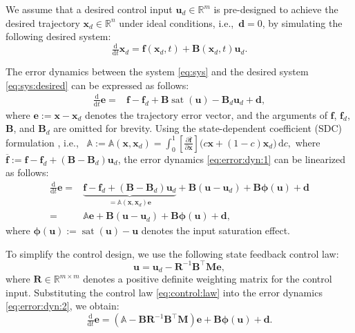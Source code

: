 \documentclass{ifacconf}
\newcommand\ie{\textrm{i.e.,\ }}
\newcommand\R{\mathbb{R}}
\newcommand*{\mv}[1]{\boldsymbol{#1}} %
\newcommand*{\mm}[1]{\boldsymbol{#1}} %
\DeclareMathOperator{\mysat}{{sat}}       %
\newcommand\der{\mathrm d}
\newcommand*{\ddtt}{
   \tfrac{\der}{\der t}
}
\newcommand*{\pptfrac}[2]{
   \tfrac{\partial {#1}}{\partial {#2}}
}
\begin{document}
We assume that a desired control input $\mv{u}_d\in\R^m$ is pre-designed to achieve the desired trajectory $\mv{x}_d\in\R^n$ under ideal conditions, \ie $\mv{d}=0$, by simulating the following desired system:
\begin{equation} \label{eq:sys:desired}
   \ddtt\mv{x}_d   =
   \mv{f}(\mv{x}_d, t)   
   +
   \mm{B}(\mv{x}_d,t) \mv{u}_d
   .
\end{equation}

The error dynamics between the system \eqref{eq:sys} and the desired system \eqref{eq:sys:desired} can be expressed as follows:
\begin{equation} \label{eq:error:dyn:1}
   \begin{aligned}
      \ddtt\mv{e}
      =&
      \mv{f}-\mv{f}_d
      + \mm{B} \mysat(\mv{u})
      - \mm{B}_d \mv{u}_d
      + \mv{d}
      ,
   \end{aligned}
\end{equation}
where $\mv{e}:=\mv{x}-\mv{x}_d$ denotes the trajectory error vector, and the arguments of $\mv{f}$, $\mv{f}_d$, $\mm{B}$, and $\mm{B}_d$ are omitted for brevity.
Using the state-dependent coefficient (SDC) formulation \cite{Dani:2015aa}, \ie 
$
   \mathbb{A}
   :=
   \mathbb{A}(\mv{x},\mv{x}_d)
   =
   \int_0^1 
   \left[
      \pptfrac{\overline{\mv{f}}}{\mv{x}}
   \right]
   \big(
      c \mv{x} + (1-c) \mv{x}_d
   \big)
   \,\der c
   ,
$
where $\overline{\mv{f}}:=\mv{f}-\mv{f}_d+(\mm{B}-\mm{B}_d)\mv{u}_d$, the error dynamics \eqref{eq:error:dyn:1} can be linearized as follows:
\begin{equation} \label{eq:error:dyn:2}
   \begin{aligned}
      \ddtt\mv{e}
      =&
      \underbrace
      {
         \mv{f}-\mv{f}_d
         +
         (
            \mm{B} 
            - \mm{B}_d 
         ) \mv{u}_d
      }_{= \mathbb{A}(\mv{x},\mv{x}_d) \mv{e}}
      + \mm{B} 
      (
         \mv{u} - \mv{u}_d
      )
      + \mm{B} \mv{\phi}(\mv{u}) + \mv{d}
      \\
      =&
      \mathbb{A} \mv{e}
      + \mm{B} 
      (\mv{u} - \mv{u}_d)
      + \mm{B} \mv{\phi}(\mv{u}) + \mv{d}
      ,
   \end{aligned}
\end{equation}
where $\mv{\phi}(\mv{u}):=\mysat(\mv{u}) - \mv{u}$ denotes the input saturation effect.

To simplify the control design, we use the following state feedback control law:
\begin{equation} \label{eq:control:law}
   \mv{u}
   =
   \mv{u}_d
   -
   \mm{R}^{-1} \mm{B}^\top \mm{M}
   \mv{e}
   ,
\end{equation}
where $\mm{R}\in\R^{m\times m}$ denotes a positive definite weighting matrix for the control input.
Substituting the control law \eqref{eq:control:law} into the error dynamics \eqref{eq:error:dyn:2}, we obtain:
\begin{equation} \label{eq:error:dyn:3}
   \ddtt\mv{e}
   \!=\!
   \left(
      \mathbb{A} - \mm{B} \mm{R}^{-1} \mm{B} ^\top \mm{M}
   \right)
   \mv{e}
   + \mm{B} \mv{\phi}(\mv{u}) + \mv{d}
   .
\end{equation}
\end{document}
